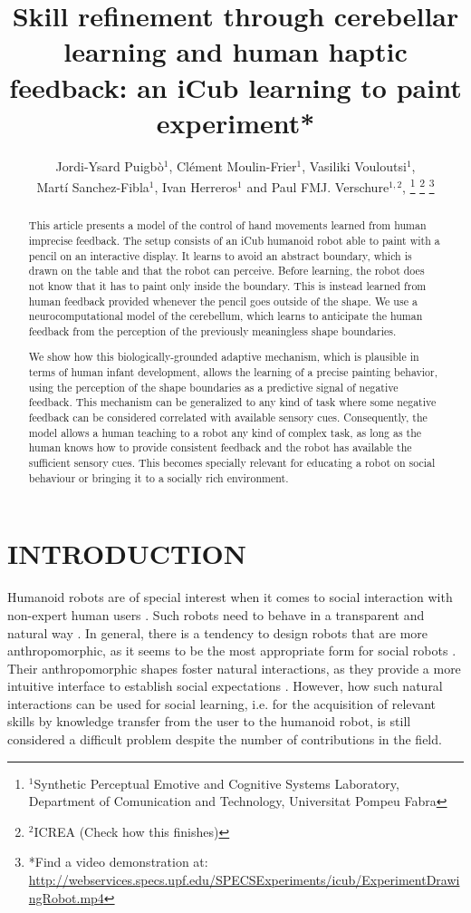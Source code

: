 \documentclass[letterpaper, 10 pt, conference]{ieeeconf}  %
\title{\LARGE \bf
Skill refinement through cerebellar learning and human haptic feedback:
an iCub learning to paint experiment*
}
\author{Jordi-Ysard Puigb\`o$^{1}$, Cl\'{e}ment Moulin-Frier$^{1}$, Vasiliki Vouloutsi$^{1}$,\\ Mart\'i Sanchez-Fibla$^{1}$, Ivan Herreros$^{1}$ and Paul FMJ. Verschure$^{1,2}$, %
\thanks{$^{1}$Synthetic Perceptual Emotive and Cognitive Systems Laboratory, Department of Comunication and Technology, Universitat Pompeu Fabra}%
\thanks{$^{2}$ICREA (Check how this finishes)
        }%
\thanks{*Find a video demonstration at: \url{http://webservices.specs.upf.edu/SPECSExperiments/icub/ExperimentDrawingRobot.mp4}}%
}
\begin{document}
\maketitle
\thispagestyle{empty}
\pagestyle{empty}


\begin{abstract}
This article presents a model of the control of hand movements learned from human imprecise feedback. 
The setup consists of an iCub humanoid robot able to paint with a pencil on an interactive display. It learns to avoid an abstract boundary, which is drawn on the table and that the robot can perceive. Before learning, the robot does not know that it has to paint only inside the boundary. This is instead learned from human feedback provided whenever the pencil goes outside of the shape. We use a neurocomputational model of the cerebellum, which learns to anticipate the human feedback from the perception of the previously meaningless shape boundaries. 

We show how this biologically-grounded adaptive mechanism, which is plausible in terms of human infant development, allows the learning of a precise painting behavior, using the perception of the shape boundaries as a predictive signal of negative feedback. This mechanism can be generalized to any kind of task where some negative feedback can be considered correlated with available sensory cues. Consequently, the model allows a human teaching to a robot any kind of complex task, as long as the human knows how to provide consistent feedback and the robot has available the sufficient sensory cues. This becomes specially relevant for educating a robot on social behaviour or bringing it to a socially rich environment. 

\end{abstract}



\section{INTRODUCTION}

Humanoid robots are of special interest when it comes to social interaction with non-expert human users \cite{goodrich2007human}. Such robots need to behave in a transparent and natural way \cite{breazeal2009role}. In general, there is a tendency to design robots that are more anthropomorphic, as it seems to be the most appropriate form for social robots \cite{disalvo2002all}. Their anthropomorphic shapes foster natural interactions, as they provide a more intuitive interface to establish social expectations \cite{duffy2003anthropomorphism}. However, how such natural interactions can be used for social learning, i.e. for the acquisition of relevant skills by knowledge transfer from the user to the humanoid robot, is still considered a difficult problem despite the number of contributions in the field. 
\end{document}
